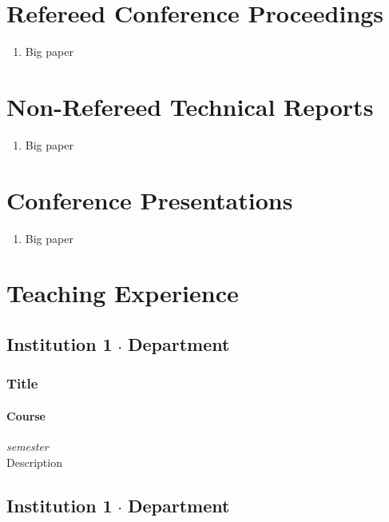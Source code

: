 \documentclass[11pt,letterpaper]{article}
\newcommand*\sq{\mathbin{\vcenter{\hbox{\rule{.3ex}{.3ex}}}}} %
\begin{document}
\section*{Refereed Conference Proceedings}
\begin{enumerate}[leftmargin=*,topsep=0pt,itemsep=.15ex,partopsep=1ex,parsep=1ex,label=(\arabic*)]
    \item Big paper
\end{enumerate}


\section*{Non-Refereed Technical Reports}
\begin{enumerate}[leftmargin=*,topsep=0pt,itemsep=.15ex,partopsep=1ex,parsep=1ex,label=(\arabic*)]
    \item Big paper
\end{enumerate}


\section*{Conference Presentations}
\begin{enumerate}[leftmargin=*,topsep=0pt,itemsep=.15ex,partopsep=1ex,parsep=1ex,label=(\arabic*)]
    \item Big paper
\end{enumerate}


\section*{Teaching Experience}
\subsection*{Institution 1 $\sq$ Department}
\subsubsection*{Title}
\paragraph*{Course}\hfill{\textit{semester}}\\
Description

\subsection*{Institution 1 $\sq$ Department}
\end{document}
